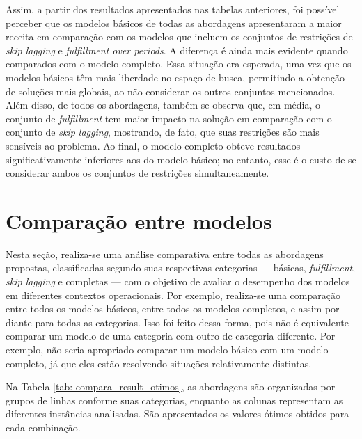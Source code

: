 Assim, a partir dos resultados apresentados nas tabelas anteriores, foi possível perceber que os modelos básicos de todas as abordagens apresentaram a maior receita em comparação com os modelos que incluem os conjuntos de restrições de \textit{skip lagging} e \textit{fulfillment over periods}. A diferença é ainda mais evidente quando comparados com o modelo completo. Essa situação era esperada, uma vez que os modelos básicos têm mais liberdade no espaço de busca, permitindo a obtenção de soluções mais globais, ao não considerar os outros conjuntos mencionados. Além disso, de todos os abordagens, também se observa que, em média, o conjunto de \textit{fulfillment} tem maior impacto na solução em comparação com o conjunto de \textit{skip lagging}, mostrando, de fato, que suas restrições são mais sensíveis ao problema. Ao final, o modelo completo obteve resultados significativamente inferiores aos do modelo básico; no entanto, esse é o custo de se considerar ambos os conjuntos de restrições simultaneamente.



\section{Comparação entre modelos} \label{sec: Comparacao_entre_modelos}

Nesta seção, realiza-se uma análise comparativa entre todas as abordagens propostas, classificadas segundo suas respectivas categorias — básicas, \textit{fulfillment}, \textit{skip lagging} e completas — com o objetivo de avaliar o desempenho dos modelos em diferentes contextos operacionais. Por exemplo, realiza-se uma comparação entre todos os modelos básicos, entre todos os modelos completos, e assim por diante para todas as categorias. Isso foi feito dessa forma, pois não é equivalente comparar um modelo de uma categoria com outro de categoria diferente. Por exemplo, não seria apropriado comparar um modelo básico com um modelo completo, já que eles estão resolvendo situações relativamente distintas.

Na Tabela \ref{tab: compara_result_otimos}, as abordagens são organizadas por grupos de linhas conforme suas categorias, enquanto as colunas representam as diferentes instâncias analisadas. São apresentados os valores ótimos obtidos para cada combinação.


